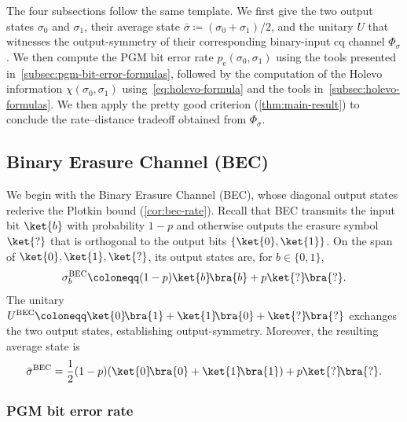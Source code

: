 \documentclass[11pt]{article}
\theoremstyle{remark}
\newcommand{\ketbra}[2]{\ket{#1}\!\bra{#2}}
\newcommand{\bits}{\{0,1\}}
\newcommand{\BEC}{\mathrm{BEC}}
\begin{document}
The four subsections follow the same template. We first give the two output states $\sigma_0$ and $\sigma_1$, their average state $\bar{\sigma} \coloneqq (\sigma_0+\sigma_1)/2$, and the unitary $U$ that witnesses the output-symmetry of their corresponding binary-input cq channel $\Phi_\sigma$. We then compute the PGM bit error rate $p_{\mathrm{e}}(\sigma_0,\sigma_1)$ using the tools presented in~\cref{subsec:pgm-bit-error-formulas}, followed by the computation of the Holevo information $\chi(\sigma_0, \sigma_1)$ using~\cref{eq:holevo-formula} and the tools in~\cref{subsec:holevo-formulas}. We then apply the pretty good criterion (\cref{thm:main-result}) to conclude the rate--distance tradeoff obtained from $\Phi_\sigma$.

\subsection{Binary Erasure Channel (BEC)}
\label{subsec:bec}

We begin with the Binary Erasure Channel (BEC), whose diagonal output states rederive the Plotkin bound (\cref{cor:bec-rate}). Recall that BEC transmits the input bit $\ket{b}$ with probability $1-p$ and otherwise outputs the erasure symbol $\ket{?}$ that is orthogonal to the output bits $\{\ket{0}, \ket{1}\}$. On the span of $\ket{0},\ket{1},\ket{?}$, its output states are, for $b \in \bits$,
\begin{equation*}
\sigma_b^{\BEC} \coloneqq (1-p)\ketbra{b}{b}+p\ketbra{?}{?}.
\end{equation*}
The unitary $U^{\BEC} \coloneqq \ketbra{0}{1}+\ketbra{1}{0}+\ketbra{?}{?}$ exchanges the two output states, establishing output-symmetry. Moreover, the resulting average state is
\begin{equation*}
\bar{\sigma}^{\BEC} = \frac{1}{2}(1-p)(\ketbra{0}{0}+\ketbra{1}{1})+p\ketbra{?}{?}.
\end{equation*}

\subsubsection{PGM bit error rate}
\label{subsubsec:bec-pgm-error}
\end{document}
